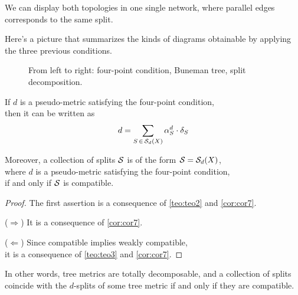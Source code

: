 \documentclass[./main.tex]{subfiles}
\begin{document}

We can display both topologies in one single network, where parallel edges corresponds to the same split.\bigskip

Here's a picture that summarizes the kinds of diagrams obtainable by applying the three previous conditions.
\begin{figure}[h]
    \centering
    From left to right: four-point condition, Buneman tree, split decomposition.
\end{figure}

\clearpage

\begin{proposition}
    If $d$ is a pseudo-metric satisfying the four-point condition, \\
    \bsp then it can be written as
    \[ d = \sum_{S \,\in\, \Sc_d(X)} \alpha_S^d \cdot \delta_S \nospblw \]
    
    Moreover, a collection of splits ${\mathcal{S}}$ is of the form ${\mathcal{S}} = {\mathcal{S}}_d(X)$, \\
    \bsp where $d$ is a pseudo-metric satisfying the four-point condition, \\
    if and only if ${\mathcal{S}}$ is compatible.
\end{proposition}
\begin{proof}
    The first assertion is a consequence of \autoref{teo:teo2} and \autoref{cor:cor7}.

    ($\Rightarrow$) It is a consequence of \autoref{cor:cor7}.

    ($\Leftarrow$) Since compatible implies weakly compatible, \\
    \Bsp{\qquad} it is a consequence of \autoref{teo:teo3} and \autoref{cor:cor7}. \qedhere
\end{proof}

In other words, tree metrics are totally decomposable, and a collection of splits coincide with the $d$-splits of some tree metric if and only if they are compatible.\bigskip
\end{document}
